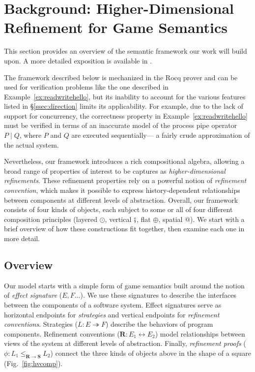 \section{Background: Higher-Dimensional Refinement for Game Semantics}
\label{sec:compcertoe}

This section provides an overview of
the semantic framework our work will build upon.
A more detailed exposition is available in \cite{compcertoe}.

The framework described below is mechanized in the Rocq prover and
can be used for verification problems
like the one described in Example~\ref{ex:readwritehello},
but its inability to account for the various features
listed in \S\ref{ssec:direction}
limits its applicability.
For example,
due to the lack of support for concurrency,
the correctness property in Example~\ref{ex:readwritehello}
must be verified in terms of an inaccurate model of
the process pipe operator $P \mathbin| Q$,
where $P$ and $Q$ are executed sequentially---%
a fairly crude approximation of the actual system.

Nevertheless,
our framework introduces a rich compositional algebra,
allowing a broad range of properties of interest
to be captures as \emph{higher-dimensional refinements}.
These refinement properties rely on
a powerful notion of \emph{refinement convention},
which makes it possible to express
history-dependent relationships
between components at different levels of abstraction.
Overall,
our framework consists of four kinds of objects,
each subject to some or all of four
different composition principles
(layered $\odot$,
 vertical $\fatsemi$,
 flat $\oplus$,
 spatial $\mathbin@$).
We start with a brief overview of how these constructions fit together,
then examine each one in more detail.

\subsection{Overview} %


Our model starts with a simple form of game semantics
built around the notion of \emph{effect signature} ($E, F\ldots$).
We use these signatures to describe the
interfaces between the components of a software system.
Effect signatures serve
as horizontal endpoints for \emph{strategies}
and vertical endpoints for \emph{refinement conventions}.
Strategies
($L : E \twoheadrightarrow F$)
describe the behaviors of program components.
Refinement conventions
($\mathbf{R} : E_1 \leftrightarrow E_2$)
model relationships between
views of the system at different levels of abstraction.
Finally,
\emph{refinement proofs}
($\phi : L_1 \le_{\mathbf{R} \rightarrow \mathbf{S}} L_2$)
connect the three kinds of objects above
in the shape of a square (Fig.~\ref{fig:hvcomp}).

